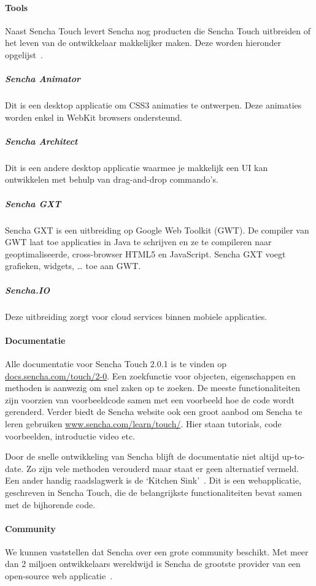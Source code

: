 \paragraph{Tools}
Naast Sencha Touch levert Sencha nog producten die Sencha Touch uitbreiden of het leven van de ontwikkelaar makkelijker maken.  Deze worden hieronder opgelijst~\cite{Inc.}.  

\subparagraph{Sencha Animator}
Dit is een desktop applicatie om CSS3 animaties te ontwerpen.  Deze animaties worden enkel in WebKit browsers ondersteund.

\subparagraph{Sencha Architect}
Dit is een andere desktop applicatie waarmee je makkelijk een UI kan ontwikkelen met behulp van drag-and-drop commando's.  

\subparagraph{Sencha GXT}
Sencha GXT is een uitbreiding op Google Web Toolkit (GWT).  De compiler van GWT laat toe applicaties in Java te schrijven en ze te compileren naar geoptimaliseerde,  cross-browser HTML5 en JavaScript.  Sencha GXT voegt grafieken,  widgets, … toe aan GWT.

\subparagraph{Sencha.IO}
Deze uitbreiding zorgt voor cloud services binnen mobiele applicaties.  

\paragraph{Documentatie}
Alle documentatie voor Sencha Touch 2.0.1 is te vinden op \url{docs.sencha.com/touch/2-0}.  Een zoekfunctie voor objecten,  eigenschappen en methoden is aanwezig om snel zaken op te zoeken.  De meeste functionaliteiten zijn voorzien van voorbeeldcode samen met een voorbeeld hoe de code wordt gerenderd.  Verder biedt de Sencha website ook een groot aanbod om Sencha te leren gebruiken \url{www.sencha.com/learn/touch/}.  Hier staan tutorials,  code voorbeelden,  introductie video etc.

Door de snelle ontwikkeling van Sencha blijft de documentatie niet altijd up-to-date.  Zo zijn vele methoden verouderd maar staat er geen alternatief vermeld. Een ander handig raadslagwerk is de ‘Kitchen Sink'~\cite{Inc.2013}.  Dit is een webapplicatie,  geschreven in Sencha Touch,  die de belangrijkste functionaliteiten bevat samen met de bijhorende code.  

\paragraph{Community}
We kunnen vaststellen dat Sencha over een grote community beschikt.  Met meer dan 2 miljoen ontwikkelaars wereldwijd is Sencha de grootste provider van een open-source web applicatie~\cite{Inc.}.  

